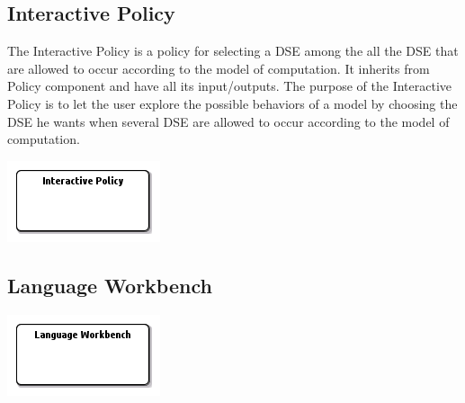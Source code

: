 \documentclass{gemoc} %
\begin{document}
\subsection{Interactive Policy}
\label{sec:Interactive_Policy}
The Interactive Policy is a policy for selecting a DSE among the all the DSE that are allowed to occur according to the model of computation.
It inherits from Policy component and have all its input/outputs.
The purpose of the Interactive Policy is to let the user explore the possible behaviors of a model by choosing the DSE he wants when several DSE are allowed to occur according to the model of computation.
\begin{center}
\includegraphics*[trim=0.0cm 0.0cm 0cm 0.0cm, clip=true]{../images/generated/Generated_Interactive_Policy.png}
\end{center}




\subsection{Language Workbench}
\label{sec:Language_Workbench}

\begin{center}
\includegraphics*[trim=0.0cm 0.0cm 0cm 0.0cm, clip=true]{../images/generated/Generated_Language_Workbench.png}
\end{center}
\end{document}
